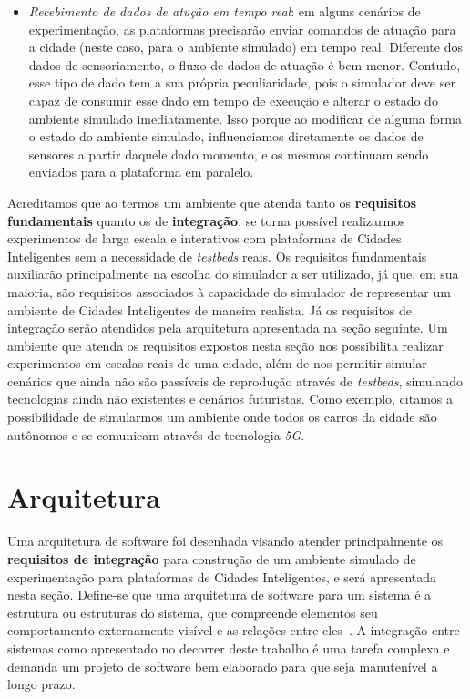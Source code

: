 \begin{itemize}
    \item \textit{Recebimento de dados de atução em tempo real}: em alguns cenários de experimentação, as plataformas precisarão enviar comandos de atuação para a cidade (neste caso,
        para o ambiente simulado) em tempo real.
        Diferente dos dados de sensoriamento, o fluxo de dados de atuação é bem menor.
        Contudo, esse tipo de dado tem a sua própria peculiaridade, pois o simulador deve ser capaz de consumir esse dado em tempo de execução e alterar o estado do ambiente simulado
        imediatamente.
        Isso porque ao modificar de alguma forma o estado do ambiente simulado, influenciamos diretamente os dados de sensores a partir daquele dado momento, e os mesmos continuam
        sendo enviados para a plataforma em paralelo.
\end{itemize}

Acreditamos que ao termos um ambiente que atenda tanto os \textbf{requisitos fundamentais} quanto os de \textbf{integração}, se torna possível realizarmos experimentos
de larga escala e interativos com plataformas de Cidades Inteligentes sem a necessidade de \textit{testbeds} reais.
Os requisitos fundamentais auxiliarão principalmente na escolha do simulador a ser utilizado, já que, em sua maioria, são requisitos associados à capacidade do simulador de representar um ambiente
de Cidades Inteligentes de maneira realista.
Já os requisitos de integração serão atendidos pela arquitetura apresentada na seção seguinte.
Um ambiente que atenda os requisitos expostos nesta seção nos possibilita realizar experimentos em escalas reais de uma cidade, além de nos permitir simular cenários que ainda não são passíveis de
reprodução através de \textit{testbeds}, simulando tecnologias ainda não existentes e cenários futuristas.
Como exemplo, citamos a possibilidade de simularmos um ambiente onde todos os carros da cidade são autônomos e se comunicam através de tecnologia \textit{5G}.

\section{Arquitetura}

Uma arquitetura de software foi desenhada visando atender principalmente os \textbf{requisitos de integração} para construção de um ambiente simulado de experimentação para plataformas
de Cidades Inteligentes, e será apresentada nesta seção.
Define-se que uma arquitetura de software para um sistema é a estrutura ou estruturas do sistema, que compreende elementos seu comportamento externamente visível e as relações entre eles~\citep{clements_2002}.
A integração entre sistemas como apresentado no decorrer deste trabalho é uma tarefa complexa e demanda um projeto de software bem elaborado para que seja manutenível a longo prazo.

